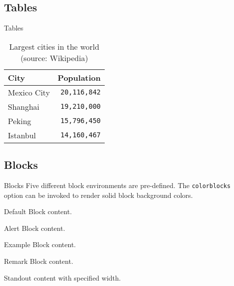 \documentclass[aspectratio=169,colorblocks,darkmode]{beamer}
\begin{document}
\subsection{Tables}
\begin{frame}{Tables}
  \begin{table}
    \caption{Largest cities in the world (source: Wikipedia)}
    \begin{tabular}{@{} lr @{}}
      \toprule
      City & Population\\
      \midrule
      Mexico City & \texttt{20,116,842}\\
      Shanghai    & \texttt{19,210,000}\\
      Peking      & \texttt{15,796,450}\\
      Istanbul    & \texttt{14,160,467}\\
      \bottomrule
    \end{tabular}
  \end{table}
\end{frame}

\subsection{Blocks}
\begin{frame}{Blocks}
  	Five different block environments are pre-defined. The \texttt{colorblocks} option can be invoked to render solid block background colors.
   
    \begin{block}{Default}
    Block content.
    \end{block}

    \begin{alertblock}{Alert}
    Block content.
    \end{alertblock}
    
    \begin{exampleblock}{Example}
    Block content.
    \end{exampleblock}

    \begin{remark}{Remark}
    Block content.
    \end{remark}
    
    \begin{standout}[4cm]
    Standout content with specified width.
    \end{standout}
\end{frame}
\end{document}

